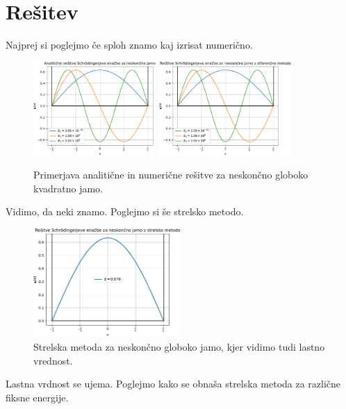 \section{Rešitev}

Najprej si poglejmo če sploh znamo kaj izrisat numerično.

\begin{figure}[h]
    \centering
    \includegraphics[width=0.415\textwidth]{pdfs/neskoncna_jama_analiticno.pdf}
    \includegraphics[width=0.45\textwidth]{pdfs/neskoncna_jama_num.pdf}
    \caption{Primerjava analitične in numerične rešitve za neskončno globoko kvadratno jamo.}
\end{figure}
Vidimo, da neki znamo. Poglejmo si še  strelsko metodo.
\begin{figure}[h]
    \centering
    \includegraphics[width=0.5\textwidth]{pdfs/neskoncna_jama_strelska.pdf}
    \caption{Strelska metoda za neskončno globoko jamo, kjer vidimo tudi lastno vrednost.}
\end{figure}
Lastna vrdnost se ujema. 
\newpage
Poglejmo kako se obnaša strelska metoda za različne fiksne energije.
